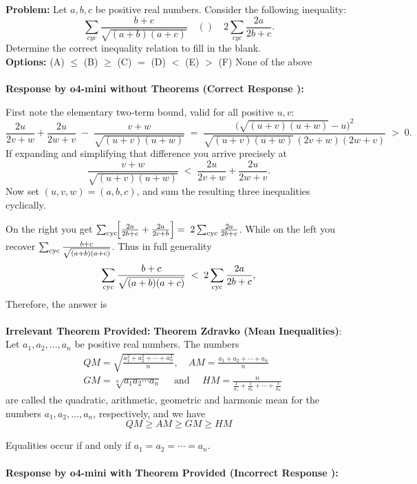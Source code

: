 \begin{examplebox}
\small
\textbf{Problem:} Let $a, b, c$ be positive real numbers. Consider the following inequality:
$$
\sum_{cyc} \frac{b+c}{\sqrt{(a+b)(a+c)}} \quad () \quad 2 \sum_{cyc} \frac{2a}{2b+c}.
$$
Determine the correct inequality relation to fill in the blank.\\
\textbf{Options:} (A) $\leq$ \quad(B) $\geq$ \quad (C) $=$  \quad (D) $<$ \quad  (E) $>$  \quad (F) None of the above
\\\\
\textbf{Response by o4-mini without Theorems (Correct Response \cmark):}

First note the elementary two‐term bound, valid for all positive \(u,v\):
\[
\frac{2u}{2v+w}+\frac{2u}{2w+v}
\;-\;\frac{v+w}{\sqrt{(u+v)(u+w)}}
\;=\;\frac{\bigl(\sqrt{(u+v)(u+w)}-u\bigr)^2}{\sqrt{(u+v)(u+w)}\,(2v+w)(2w+v)}
\;>\;0.
\]
If expanding and simplifying that difference you arrive precisely at
\[
\frac{v+w}{\sqrt{(u+v)(u+w)}}\;<\;
\frac{2u}{2v+w}+\frac{2u}{2w+v}.
\]
Now set \((u,v,w)=(a,b,c)\), and sum the resulting three inequalities cyclically.  

On the right you get $\sum_{\rm cyc}\!\Bigl[\frac{2a}{2b+c}+\frac{2a}{2c+b}\Bigr]
=\;2\sum_{\rm cyc}\frac{2a}{2b+c}$. 
While on the left you recover \(\sum_{\rm cyc}\tfrac{b+c}{\sqrt{(a+b)(a+c)}}\).  Thus in full generality
\[
\sum_{\rm cyc}\frac{b+c}{\sqrt{(a+b)(a+c)}}\;<\;
2\sum_{\rm cyc}\frac{2a}{2b+c},
\]
Therefore, the answer is 
\\\\
\textbf{Irrelevant Theorem Provided:} \textbf{Theorem Zdravko (Mean Inequalities)}: Let $a_{1}, a_{2}, \ldots, a_{n}$ be positive real numbers. The numbers
$$
\begin{aligned}
& Q M=\sqrt{\frac{a_{1}^{2}+a_{2}^{2}+\cdots+a_{n}^{2}}{n}}, \quad A M=\frac{a_{1}+a_{2}+\cdots+a_{n}}{n} \\
& G M=\sqrt[n]{a_{1} a_{2} \cdots a_{n}} \quad \text { and } \quad H M=\frac{n}{\frac{1}{a_{1}}+\frac{1}{a_{2}}+\cdots+\frac{1}{a_{n}}}
\end{aligned}
$$
are called the quadratic, arithmetic, geometric and harmonic mean for the numbers $a_{1}, a_{2}, \ldots, a_{n}$, respectively, and we have
$$
Q M \geq A M \geq G M \geq H M
$$

Equalities occur if and only if $a_{1}=a_{2}=\cdots=a_{n}$.
\\\\
\textbf{Response by o4-mini with Theorem Provided (Incorrect Response \xmark):}


\end{examplebox}
